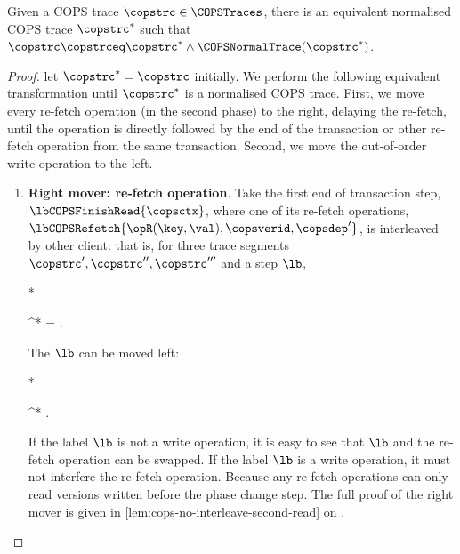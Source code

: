 \begin{theorem}
Given a COPS trace \( \copstrc \in \COPSTraces \),
there is an equivalent normalised COPS trace \( \copstrc^* \)
such that \( \copstrc \copstrceq \copstrc^* \land \COPSNormalTrace(\copstrc^*) \).
\end{theorem}
\begin{proof}
let \( \copstrc^* = \copstrc \) initially.
We perform the following equivalent transformation until \( \copstrc^* \) is a normalised COPS trace.
First, we move every re-fetch operation (in the second phase) to the right, delaying the re-fetch,
until the operation is directly followed by the end of the transaction or other re-fetch operation from the same transaction.
Second, we move the out-of-order write operation to the left.
\begin{enumerate}
\item{\textbf{Right mover: re-fetch operation}.} \label{item:cops-second-read}
    Take the first end of transaction step, \( \lbCOPSFinishRead{\copsctx} \), where
    one of its re-fetch operations, \(\lbCOPSRefetch{\opR(\key,\val), \copsverid, \copsdep' }\), 
    is interleaved by other client: that is,
    for three trace segments \( \copstrc', \copstrc'', \copstrc''' \) and a step \( \lb \),
    \begin{Formulae}*
    \begin{Formula}
        \copstrc^* = 
        \land \lb \neq {} .
    \end{Formula}
    \end{Formulae}
    The \( \lb \) can be moved left:
    \begin{Formulae}*
    \begin{Formula}
        \begin{Bracketed}  
        \end{Bracketed} \copstrceq \copstrc^* .
    \end{Formula}
    \end{Formulae}
    If the label \( \lb \) is not a write operation, 
    it is easy to see that \( \lb \) and the re-fetch operation can be swapped.
    If the label \( \lb \) is a write operation, it must not interfere the re-fetch operation.
    Because any re-fetch operations can only read versions written before the phase change step.
    The full proof of the right mover is given in \cref{lem:cops-no-interleave-second-read}
    on \pageref{lem:cops-no-interleave-second-read}.


\end{enumerate}
\end{proof}
